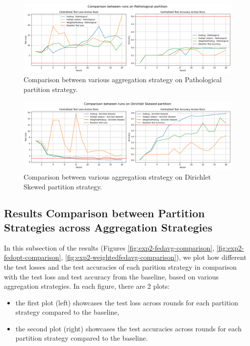 \documentclass[11pt]{article}
\begin{document}
    \begin{figure}[h!]
        \centering
        \includegraphics[width=1\linewidth]{img/experiment_2/pathological-comparison}
        \caption{Comparison between various aggregation strategy on Pathological partition strategy.}
        \label{fig:exp2-pathological-comparison}
    \end{figure}

    \begin{figure}[h!]
        \centering
        \includegraphics[width=1\linewidth]{img/experiment_2/dirichlet-skewed-comparison}
        \caption{Comparison between various aggregation strategy on Dirichlet Skewed partition strategy.}
        \label{fig:exp2-dirichlet-skewed-comparison}
    \end{figure}

    \subsection{Results Comparison between Partition Strategies across Aggregation Strategies}
    In this subsection of the results (Figures \ref{fig:exp2-fedavg-comparison}, \ref{fig:exp2-fedopt-comparison}, \ref{fig:exp2-weightedfedavg-comparison}), we plot how different the test losses and the test accuracies of each parition strategy in comparison with the test loss and test accuracy from the baseline, based on various aggregation strategies. In each figure, there are 2 plots:
    \begin{itemize}
        \item the first plot (left) showcases the test loss across rounds for each partition strategy compared to the baseline,
        \item the second plot (right) showcases the test accuracies across rounds for each partition strategy compared to the baseline.
    \end{itemize}
\end{document}
